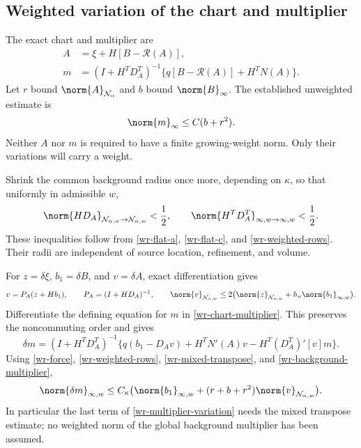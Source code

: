 \subsection{Weighted variation of the chart and multiplier}
\label{wr-variation}

The exact chart and multiplier are
\begin{equation}\label{wr-chart-multiplier}
 \begin{split}
 A&=\xi+H[B-\mathcal R(A)],\\
 m&=(I+H^TD_A^T)^{-1}
             \{q[B-\mathcal R(A)]+H^TN(A)\}.
 \end{split}
\end{equation}
Let $r$ bound $\norm{A}_{\mathcal N_\alpha}$ and $b$ bound
$\norm{B}_\infty$. The established unweighted estimate is
\begin{equation}\label{wr-background-multiplier}
 \norm{m}_\infty\le C(b+r^2).
\end{equation}
Neither $A$ nor $m$ is required to have a finite growing-weight
norm. Only their variations will carry a weight.

Shrink the common background radius once more, depending on
$\kappa$, so that uniformly in admissible $w$,
\begin{equation}\label{wr-inverse-smallness}
 \norm{HD_A}_{\mathcal N_{\alpha,w}\to\mathcal N_{\alpha,w}}<\frac12,
 \qquad
 \norm{H^TD_A^T}_{\infty,w\to\infty,w}<\frac12.
\end{equation}
These inequalities follow from \eqref{wr-flat-a},
\eqref{wr-flat-c}, and \eqref{wr-weighted-rows}. Their radii
are independent of source location, refinement, and volume.

For $z=\delta\xi$, $b_1=\delta B$, and $v=\delta A$, exact
differentiation gives
\begin{equation}\label{wr-chart-variation}
 v=P_A(z+Hb_1),\qquad P_A=(I+HD_A)^{-1},\qquad
 \norm{v}_{\mathcal N_{\alpha,w}}
 \le2\bigl(\norm{z}_{\mathcal N_{\alpha,w}}
                       +h_\kappa\norm{b_1}_{\infty,w}\bigr).
\end{equation}
Differentiate the defining equation for $m$ in
\eqref{wr-chart-multiplier}. This preserves the noncommuting
order and gives
\begin{equation}\label{wr-multiplier-variation}
 \boxed{\quad
 \delta m=(I+H^TD_A^T)^{-1}
 \{q(b_1-D_Av)+H^TN'(A)v-H^T(D_A^T)'[v]m\}.
 \quad}
\end{equation}
Using \eqref{wr-force}, \eqref{wr-weighted-rows},
\eqref{wr-mixed-transpose}, and
\eqref{wr-background-multiplier},
\begin{equation}\label{wr-multiplier-variation-bound}
 \norm{\delta m}_{\infty,w}
 \le C_\kappa\bigl(\norm{b_1}_{\infty,w}
        +(r+b+r^2)\norm{v}_{\mathcal N_{\alpha,w}}\bigr).
\end{equation}
In particular the last term of
\eqref{wr-multiplier-variation} needs the mixed transpose
estimate; no weighted norm of the global background multiplier
has been assumed.

